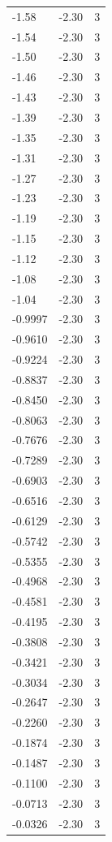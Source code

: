 \begin{longtable}{lrr}
  -1.58 & -2.30 & 3 \\
  -1.54 & -2.30 & 3 \\
  -1.50 & -2.30 & 3 \\
  -1.46 & -2.30 & 3 \\
  -1.43 & -2.30 & 3 \\
  -1.39 & -2.30 & 3 \\
  -1.35 & -2.30 & 3 \\
  -1.31 & -2.30 & 3 \\
  -1.27 & -2.30 & 3 \\
  -1.23 & -2.30 & 3 \\
  -1.19 & -2.30 & 3 \\
  -1.15 & -2.30 & 3 \\
  -1.12 & -2.30 & 3 \\
  -1.08 & -2.30 & 3 \\
  -1.04 & -2.30 & 3 \\
  -0.9997 & -2.30 & 3 \\
  -0.9610 & -2.30 & 3 \\
  -0.9224 & -2.30 & 3 \\
  -0.8837 & -2.30 & 3 \\
  -0.8450 & -2.30 & 3 \\
  -0.8063 & -2.30 & 3 \\
  -0.7676 & -2.30 & 3 \\
  -0.7289 & -2.30 & 3 \\
  -0.6903 & -2.30 & 3 \\
  -0.6516 & -2.30 & 3 \\
  -0.6129 & -2.30 & 3 \\
  -0.5742 & -2.30 & 3 \\
  -0.5355 & -2.30 & 3 \\
  -0.4968 & -2.30 & 3 \\
  -0.4581 & -2.30 & 3 \\
  -0.4195 & -2.30 & 3 \\
  -0.3808 & -2.30 & 3 \\
  -0.3421 & -2.30 & 3 \\
  -0.3034 & -2.30 & 3 \\
  -0.2647 & -2.30 & 3 \\
  -0.2260 & -2.30 & 3 \\
  -0.1874 & -2.30 & 3 \\
  -0.1487 & -2.30 & 3 \\
  -0.1100 & -2.30 & 3 \\
  -0.0713 & -2.30 & 3 \\
  -0.0326 & -2.30 & 3 \\

\end{longtable}

